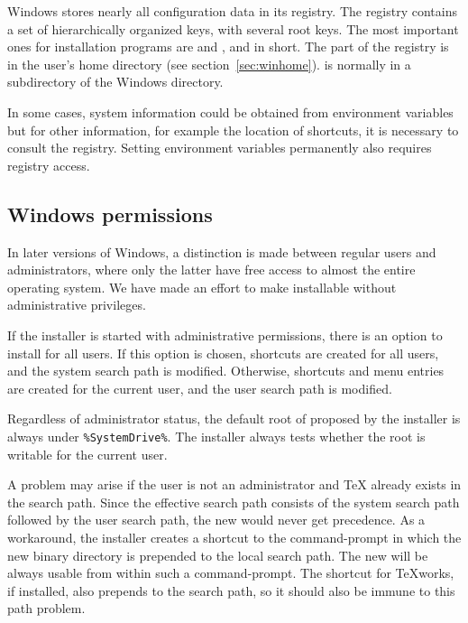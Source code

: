 \documentclass[12pt]{article}
\begin{document}
Windows stores nearly all configuration data in its registry.  The
registry contains a set of hierarchically organized keys, with several
root keys. The most important ones for installation programs are
 and ,  and
 in short. The  part of the registry is in the
user's home directory (see section~\ref{sec:winhome}).   is
normally in a subdirectory of the Windows directory.

In some cases, system information could be obtained from environment
variables but for other information, for example the location of
shortcuts, it is necessary to consult the registry.  Setting environment
variables permanently also requires registry access.


\subsection{Windows permissions}
\label{sec:winpermissions}

In later versions of Windows, a distinction is made between regular
users and administrators, where only the latter have free access to almost the
entire operating system. We have made an effort to make \TL{}
installable without administrative privileges.

If the installer is started with administrative permissions, there is an
option to install for all users.  If this option is chosen, shortcuts
are created for all users, and the system search path is
modified. Otherwise, shortcuts and menu entries are created for the
current user, and the user search path is modified.

Regardless of administrator status, the default root of \TL{} proposed
by the installer is always under \verb|%SystemDrive%|. The installer
always tests whether the root is writable for the current user.

A problem may arise if the user is not an administrator and \TeX{}
already exists in the search path.  Since the effective search path
consists of the system search path followed by the user search path, the
new \TL{} would never get precedence.  As a workaround, the installer
creates a shortcut to the command-prompt in which the new \TL{} binary
directory is prepended to the local search path.  The new \TL{} will be
always usable from within such a command-prompt. The shortcut for
\TeX{}works, if installed, also prepends \TL{} to the search path, so it
should also be immune to this path problem.
\end{document}
